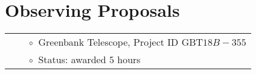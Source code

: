 \documentclass[11pt,letterpaper,sans,unicode]{moderncv}
\begin{document}

\section{Observing Proposals}

\begin{tabular}{rcl}
&\hspace{0.4cm} &{\color{color1} $\circ\;\;$}Greenbank Telescope, Project ID GBT$18B-355$ \\
&\hspace{0.4cm} &{\color{color1} $\circ\;\;$}Status: awarded $5$ hours
\end{tabular}
\end{document}
